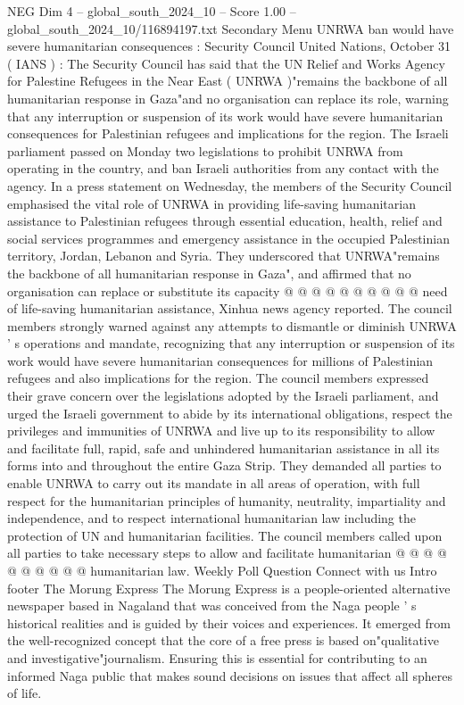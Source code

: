 \begin{textsample}{NEG Dim 4 – global\_south\_2024\_10 – Score 1.00 – global\_south\_2024\_10/116894197.txt}  \label{ex:f4_neg_066}
Secondary Menu UNRWA ban would have severe humanitarian consequences : Security Council United Nations, October 31 ( IANS ) : The Security Council has said that the UN Relief and Works Agency for Palestine Refugees in the Near East ( UNRWA )"remains the backbone of all humanitarian response in Gaza"and no organisation can replace its role, warning that any interruption or suspension of its work would have severe humanitarian consequences for Palestinian refugees and implications for the region.
The Israeli parliament passed on Monday two legislations to prohibit UNRWA from operating in the country, and ban Israeli authorities from any contact with the agency.
In a press statement on Wednesday, the members of the Security Council emphasised the vital role of UNRWA in providing life-saving humanitarian assistance to Palestinian refugees through essential education, health, relief and social services programmes and emergency assistance in the occupied Palestinian territory, Jordan, Lebanon and Syria.
They underscored that UNRWA"remains the backbone of all humanitarian response in Gaza", and affirmed that no organisation can replace or substitute its capacity @ @ @ @ @ @ @ @ @ @ need of life-saving humanitarian assistance, Xinhua news agency reported.
The council members strongly warned against any attempts to dismantle or diminish UNRWA ' s operations and mandate, recognizing that any interruption or suspension of its work would have severe humanitarian consequences for millions of Palestinian refugees and also implications for the region.
The council members expressed their grave concern over the legislations adopted by the Israeli parliament, and urged the Israeli government to abide by its international obligations, respect the privileges and immunities of UNRWA and live up to its responsibility to allow and facilitate full, rapid, safe and unhindered humanitarian assistance in all its forms into and throughout the entire Gaza Strip.
They demanded all parties to enable UNRWA to carry out its mandate in all areas of operation, with full respect for the humanitarian principles of humanity, neutrality, impartiality and independence, and to respect international humanitarian law including the protection of UN and humanitarian facilities.
The council members called upon all parties to take necessary steps to allow and facilitate humanitarian @ @ @ @ @ @ @ @ @ @ humanitarian law.
Weekly Poll Question Connect with us Intro footer The Morung Express The Morung Express is a people-oriented alternative newspaper based in Nagaland that was conceived from the Naga people ' s historical realities and is guided by their voices and experiences.
It emerged from the well-recognized concept that the core of a free press is based on"qualitative and investigative"journalism.
Ensuring this is essential for contributing to an informed Naga public that makes sound decisions on issues that affect all spheres of life.

\end{textsample}
